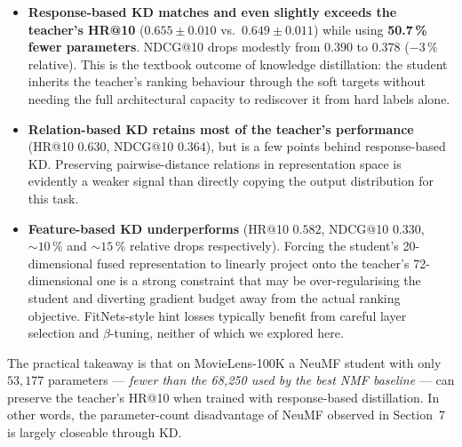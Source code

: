\documentclass[11pt,a4paper]{article}
\newcommand{\inputtab}[1]{}
\begin{document}
\begin{itemize}
  \item \textbf{Response-based KD matches and even slightly exceeds the
        teacher's HR@10} ($0.655 \pm 0.010$ vs.\ $0.649 \pm 0.011$) while
        using \textbf{50.7\,\% fewer parameters}. NDCG@10 drops modestly
        from $0.390$ to $0.378$ ($-3\,\%$ relative). This is the textbook
        outcome of knowledge distillation: the student inherits the
        teacher's ranking behaviour through the soft targets without
        needing the full architectural capacity to rediscover it from
        hard labels alone.
  \item \textbf{Relation-based KD retains most of the teacher's
        performance} (HR@10 $0.630$, NDCG@10 $0.364$), but is a few
        points behind response-based KD. Preserving pairwise-distance
        relations in representation space is evidently a weaker signal
        than directly copying the output distribution for this task.
  \item \textbf{Feature-based KD underperforms} (HR@10 $0.582$,
        NDCG@10 $0.330$, $\sim\!10\,\%$ and $\sim\!15\,\%$ relative
        drops respectively). Forcing the student's 20-dimensional fused
        representation to linearly project onto the teacher's
        72-dimensional one is a strong constraint that may be
        over-regularising the student and diverting gradient budget
        away from the actual ranking objective. FitNets-style hint
        losses typically benefit from careful layer selection and
        $\beta$-tuning, neither of which we explored here.
\end{itemize}

The practical takeaway is that on MovieLens-100K a NeuMF student with
only $53{,}177$ parameters --- \emph{fewer than the 68{,}250 used by the
best NMF baseline} --- can preserve the teacher's HR@10 when trained with
response-based distillation. In other words, the parameter-count
disadvantage of NeuMF observed in Section~7 is largely closeable through
KD.

\begin{table}[H]
  \centering
  \caption{Teacher NeuMF vs.\ three distilled students with the same
           smaller architecture (mean $\pm$ std, 10 seeds). All three
           students have the same parameter count; they differ only in
           the distillation loss used during training.}
  \label{tab:task12}
  \inputtab{tab_task12_kd}
\end{table}
\end{document}
